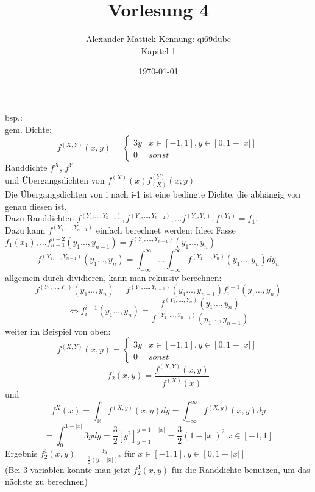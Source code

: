 \documentclass{article}
\author{
Alexander Mattick Kennung: qi69dube\\
Kapitel 1
}
\date{\today}
\title{Vorlesung 4}
\begin{document}
	\maketitle
	bsp.:\\
	gem. Dichte:
	\[f^{(X,Y)}(x,y)= \begin{cases}3y&x\in[-1,1],y\in[0,1-|x|]\\0&sonst\end{cases}\]
	Randdichte $f^X$, $f^Y$\\
	und Übergangsdichten von $f^{(X)} (x)f^{(Y)}_{(X)} (x;y)$\\
	Die Übergangsdichten von i nach i-1 ist eine bedingte Dichte, die abhängig von genau diesen ist.\\
	Dazu Randdichten $f^{(Y_1,\dots,Y_{n-1})},f^{(Y_1,\dots,Y_{n-2})},\dots f^{(Y_1,Y_2)}, f^{(Y_1)}=f_1$.\\
	Dazu kann $f^{(Y_1,\dots,Y_{n-1})}$ einfach berechnet werden:
	Idee: Fasse $f_1(x_1),\dots f^{n-2}_{n-1}(y_1\dots,y_{n-1})= f^{(Y_1,\dots,Y_{n-1})}(y_1\dots,y_n)$\\
	\[f^{(Y_1,\dots,Y_{n-1})}(y_1\dots,y_n) =\int^\infty_{-\infty}\dots\int^\infty_{-\infty}f^{(Y_1,\dots,Y_{n})}(y_1\dots,y_n)dy_n\]
	allgemein durch dividieren, kann man rekursiv berechnen:
	\[f^{(Y_1,\dots,Y_{n})}(y_1\dots,y_n) =f^{(Y_1,\dots,Y_{n-1})}(y_1\dots,y_{n-1})f^{i-1}_i(y_1\dots,y_n)\]
	\[\iff f^{i-1}_i(y_1\dots,y_n) =\frac{f^{(Y_1,\dots,Y_{n})}(y_1\dots,y_n) }{f^{(Y_1,\dots,Y_{n-1})}(y_1\dots,y_{n-1})}\]
	weiter im Beispiel von oben:\\
	\[f^{(X,Y)}(x,y)= \begin{cases}3y&x\in[-1,1],y\in[0,1-|x|]\\0&sonst\end{cases}\]
	\[f^1_2(x,y)=\frac{f^{(X,Y)}(x,y)}{f^{(X)}(x)}\]
	und 
	\[f^X(x) = \int_\mathbb{R} f^{(X,y)}(x,y)dy = \int^\infty_{-\infty}f^{(X,y)}(x,y)dy\]
	\[=\int ^{1-|x|}_0 3y dy=\frac{3}{2}[y^2]_{y=1}^{y=1-|x|} = \frac{3}{2}(1-|x|)^2\; x\in[-1,1]\]
	Ergebnis $f^1_2(x,y)=\frac{3y}{\frac{3}{2}(y-|x|)^2}$ für $x\in[-1,1], y\in[0,1-|x|]$\\
	(Bei 3 variablen könnte man jetzt $f^1_2(x,y)$ für die Randdichte benutzen, um das nächste zu berechnen)
\end{document}
